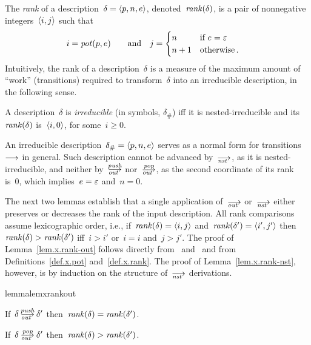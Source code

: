 \begin{definition}
  \label{def.x.rank}
  The \emph{rank} of a description~$\delta=\<p,n,e>$,
  denoted~$\operatorname{\mathit{rank}}(\delta)$, is a pair of nonnegative integers~$\<i,j>$ such
  that
  \begin{alignat*}{2}
    i&=\operatorname{\mathit{pot}}(p,e) &\quad\text{and}\quad
    j&=
       \begin{cases}
         n  &\text{if~$e=\varepsilon$}\\
         n+1&\text{otherwise\,.}
       \end{cases}
  \end{alignat*}
Intuitively, the rank of a description~$\delta$ is a measure of the maximum
amount of ``work'' (transitions) required to transform~$\delta$ into an
irreducible description, in the following sense.
\end{definition}


\begin{definition}
  \label{def.x.H}
  A description~$\delta$ is \emph{irreducible} (in symbols, $\delta_\#$) iff
  it is nested-irreducible and its~$\operatorname{\mathit{rank}}(\delta)$ is~$\<i,0>$, for
  some~$i\ge0$.
\end{definition}

An irreducible description~$\delta_\#=\<p,n,e>$ serves as a normal form for
transitions~$\trans$ in general.  Such description cannot be advanced
by~$\nst$, as it is nested-irreducible, and neither by~$\outpush$
nor~$\outpop$, as the second coordinate of its rank is~0, which
implies~$e=\varepsilon$ and~$n=0$.

The next two lemmas establish that a single application of~$\out$ or~$\nst$
either preserves or decreases the rank of the input description.  All rank
comparisons assume lexicographic order, i.e., if~$\rank(\delta)=\<i,j>$
and~$\rank(\delta')=\<i',j'>$ then~$\operatorname{\mathit{rank}}(\delta)>\operatorname{\mathit{rank}}(\delta')$ iff~$i>i'$
or~$i=i$ and~$j>j'$.
The proof of Lemma~\ref{lem.x.rank-out} follows directly from~
and~ and from Definitions~\ref{def.x.pot} and~\ref{def.x.rank}.  The
proof of Lemma~\ref{lem.x.rank-nst}, however, is by induction on the
structure of~$\nst$ derivations.

\begin{restatable}{lemma}{lemxrankout}\strut
  \label{lem.x.rank-out}
  \begin{enumerate:a}
  \item\label{lem.x.rank-out-push} If~$\delta\outpush\delta'$
    then~$\operatorname{\mathit{rank}}(\delta)=\operatorname{\mathit{rank}}(\delta')$.
  \item\label{lem.x.rank-out-pop} If~$\delta\outpop\delta'$
    then~$\operatorname{\mathit{rank}}(\delta)>\operatorname{\mathit{rank}}(\delta')$.
  \end{enumerate:a}
\end{restatable}

